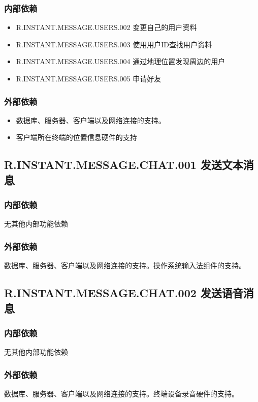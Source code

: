 {    \subsubsection{内部依赖}
    \begin{itemize}
        \item R.INSTANT.MESSAGE.USERS.002 变更自己的用户资料
        \item R.INSTANT.MESSAGE.USERS.003 使用用户ID查找用户资料
        \item R.INSTANT.MESSAGE.USERS.004 通过地理位置发现周边的用户
        \item R.INSTANT.MESSAGE.USERS.005 申请好友
    \end{itemize}
    \subsubsection{外部依赖}
    \begin{itemize}
        \item 数据库、服务器、客户端以及网络连接的支持。
        \item 客户端所在终端的位置信息硬件的支持
    \end{itemize}
    
}


\subsection{R.INSTANT.MESSAGE.CHAT.001 发送文本消息}
\subsubsection{内部依赖}
    无其他内部功能依赖
\subsubsection{外部依赖}
    数据库、服务器、客户端以及网络连接的支持。操作系统输入法组件的支持。

	
\subsection{R.INSTANT.MESSAGE.CHAT.002 发送语音消息}
\subsubsection{内部依赖}
    无其他内部功能依赖
\subsubsection{外部依赖}
    数据库、服务器、客户端以及网络连接的支持。终端设备录音硬件的支持。

